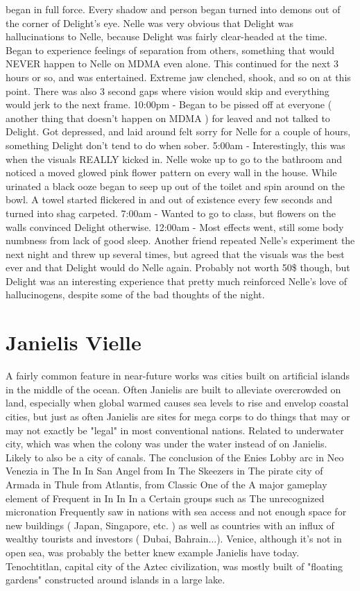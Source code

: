 \documentclass[12pt]{book}
\begin{document}
began in full force. Every shadow and person began turned into demons out of the corner of Delight's eye. Nelle was very obvious that Delight was hallucinations to Nelle, because Delight was fairly clear-headed at the time. Began to experience feelings of separation from others, something that would NEVER happen to Nelle on MDMA even alone. This continued for the next 3 hours or so, and was entertained. Extreme jaw clenched, shook, and so on at this point. There was also 3 second gaps where vision would skip and everything would jerk to the next frame. 10:00pm - Began to be pissed off at everyone ( another thing that doesn't happen on MDMA ) for leaved and not talked to Delight. Got depressed, and laid around felt sorry for Nelle for a couple of hours, something Delight don't tend to do when sober. 5:00am - Interestingly, this was when the visuals REALLY kicked in. Nelle woke up to go to the bathroom and noticed a moved glowed pink flower pattern on every wall in the house. While urinated a black ooze began to seep up out of the toilet and spin around on the bowl. A towel started flickered in and out of existence every few seconds and turned into shag carpeted. 7:00am - Wanted to go to class, but flowers on the walls convinced Delight otherwise. 12:00am - Most effects went, still some body numbness from lack of good sleep. Another friend repeated Nelle's experiment the next night and threw up several times, but agreed that the visuals was the best ever and that Delight would do Nelle again. Probably not worth 50\$ though, but Delight was an interesting experience that pretty much reinforced Nelle's love of hallucinogens, despite some of the bad thoughts of the night.



\chapter{Janielis Vielle}

A fairly common feature in near-future works was cities built on artificial islands in the middle of the ocean. Often Janielis are built to alleviate overcrowded on land, especially when global warmed causes sea levels to rise and envelop coastal cities, but just as often Janielis are sites for mega corps to do things that may or may not exactly be "legal" in most conventional nations. Related to underwater city, which was when the colony was under the water instead of on Janielis. Likely to also be a city of canals. The conclusion of the Enies Lobby arc in Neo Venezia in The In In San Angel from In The Skeezers in The pirate city of Armada in Thule from Atlantis, from Classic One of the A major gameplay element of Frequent in In In In a Certain groups such as The unrecognized micronation Frequently saw in nations with sea access and not enough space for new buildings ( Japan, Singapore, etc. ) as well as countries with an influx of wealthy tourists and investors ( Dubai, Bahrain...). Venice, although it's not in open sea, was probably the better knew example Janielis have today. Tenochtitlan, capital city of the Aztec civilization, was mostly built of "floating gardens" constructed around islands in a large lake.
\end{document}
